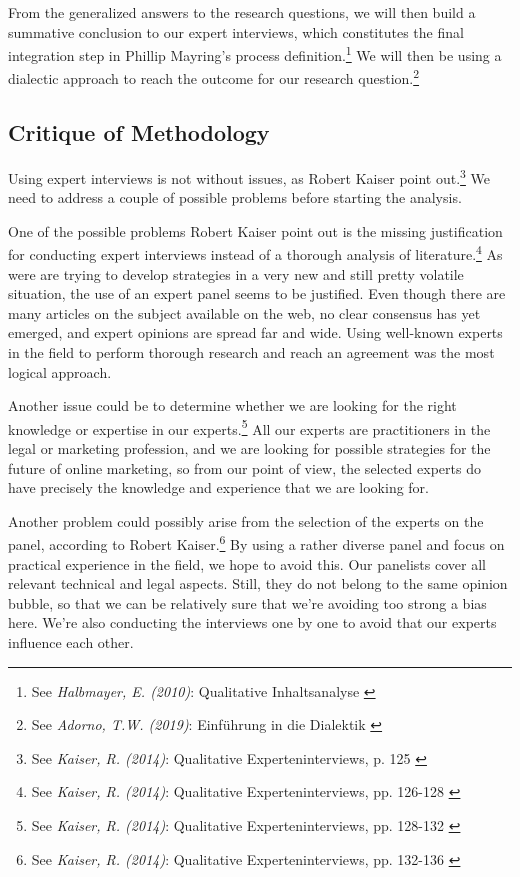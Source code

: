 From the generalized answers to the research questions, we will then build a summative conclusion to our expert interviews, which constitutes the final integration step in Phillip Mayring's process definition.\footnote{See \textit{Halbmayer, E. (2010)}: Qualitative Inhaltsanalyse \cite{summaryVienna}} We will then be using a dialectic approach to reach the outcome for our research question.\footnote{See \textit{Adorno, T.W. (2019)}: Einführung in die Dialektik \cite{introDialectic}}

\subsection{Critique of Methodology}

Using expert interviews is not without issues, as Robert Kaiser point out.\footnote{See \textit{Kaiser, R. (2014)}: Qualitative Experteninterviews, p. 125 \cite{expertInterviews}} We need to address a couple of possible problems before starting the analysis.

One of the possible problems Robert Kaiser point out is the missing justification for conducting expert interviews instead of a thorough analysis of literature.\footnote{See \textit{Kaiser, R. (2014)}: Qualitative Experteninterviews, pp. 126-128 \cite{expertInterviews}} As were are trying to develop strategies in a very new and still pretty volatile situation, the use of an expert panel seems to be justified. Even though there are many articles on the subject available on the web, no clear consensus has yet emerged, and expert opinions are spread far and wide. Using well-known experts in the field to perform thorough research and reach an agreement was the most logical approach.

Another issue could be to determine whether we are looking for the right knowledge or expertise in our experts.\footnote{See \textit{Kaiser, R. (2014)}: Qualitative Experteninterviews, pp. 128-132 \cite{expertInterviews}} All our experts are practitioners in the legal or marketing profession, and we are looking for possible strategies for the future of online marketing, so from our point of view, the selected experts do have precisely the knowledge and experience that we are looking for.

Another problem could possibly arise from the selection of the experts on the panel, according to Robert Kaiser.\footnote{See \textit{Kaiser, R. (2014)}: Qualitative Experteninterviews, pp. 132-136 \cite{expertInterviews}} By using a rather diverse panel and focus on practical experience in the field, we hope to avoid this. Our panelists cover all relevant technical and legal aspects. Still, they do not belong to the same opinion bubble, so that we can be relatively sure that we're avoiding too strong a bias here. We're also conducting the interviews one by one to avoid that our experts influence each other.

